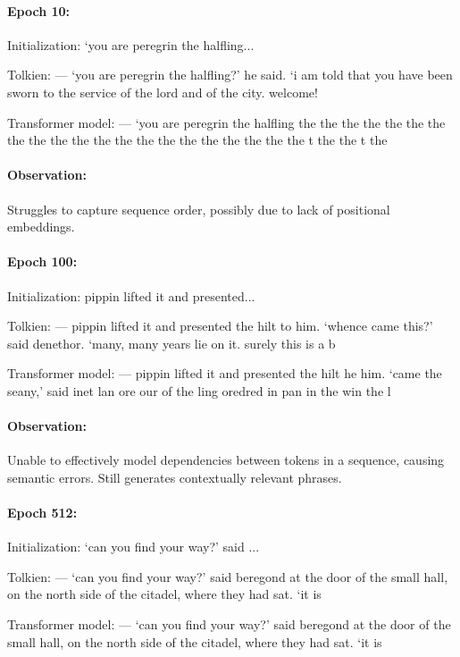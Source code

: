 \documentclass[11pt]{article}
\numberwithin{equation}{section}
\begin{document}
\paragraph{Epoch 10:}

Initialization: ‘you are peregrin the halfling...

Tolkien: --- ‘you are peregrin the halfling?’ he said. ‘i am told that you have
been sworn to the service of the lord and of the city. welcome!

Transformer model: --- ‘you are peregrin the halfling the the the the the the the
the the the the the the the the the the the the the the t the the t the

\paragraph{Observation:} Struggles to capture sequence order, possibly due to lack of
positional embeddings.

\paragraph{Epoch 100:}

Initialization: pippin lifted it and presented...

Tolkien: --- pippin lifted it and presented the hilt to him. ‘whence came this?’
said denethor. ‘many, many years lie on it. surely this is a b

Transformer model: --- pippin lifted it and presented the hilt he him. ‘came the
seany,’ said inet lan ore our of the ling oredred in pan in the win the l

\paragraph{Observation:} Unable to effectively model dependencies between tokens in a
sequence, causing semantic errors. Still generates contextually relevant phrases.

\paragraph{Epoch 512:}

Initialization: ‘can you find your way?’ said ...

Tolkien: --- ‘can you find your way?’ said beregond at the door of the small hall,
on the north side of the citadel, where they had sat. ‘it is

Transformer model: --- ‘can you find your way?’ said beregond at the door of the
small hall, on the north side of the citadel, where they had sat. ‘it is
\end{document}
